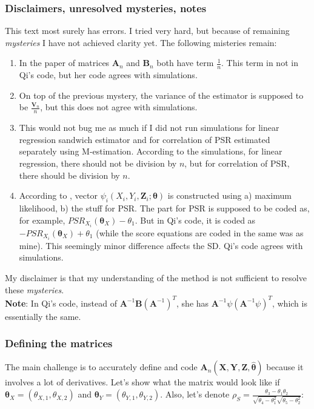 \documentclass[]{article}
\begin{document}
\subsubsection{Disclaimers, unresolved mysteries, notes}
This text most surely has errors. I tried very hard, but because of remaining \emph{mysteries} I have not achieved clarity yet. The following misteries remain:
\begin{enumerate}[1)]
  \item In the paper of \cite{stefanski2002calculus} matrices $\pmb{A}_n$ and $\pmb{B}_n$ both have term $\frac{1}{n}$. This term in not in Qi's code, but her code agrees with simulations.
  \item On top of the previous mystery, the variance of the estimator is supposed to be $\frac{\pmb{V}_n}{n}$, but this does not agree with simulations.
  \item This would not bug me as much if I did not run simulations for linear regression sandwich estimator and for correlation of PSR estimated separately using M-estimation. According to the simulations, for linear regression, there should not be division by $n$, but for correlation of PSR, there should be division by $n$.
  \item According to \cite{stefanski2002calculus}, vector $\psi_i(X_i, Y_i, \pmb{Z}_i; \pmb{\theta})$ is constructed using a) maximum likelihood, b) the stuff for PSR. The part for PSR is supposed to be coded as, for example, $PSR_{X_{i}}(\pmb{\theta}_X) -\theta_1$. But in Qi's code, it is coded as $-PSR_{X_{i}}(\pmb{\theta}_X) +\theta_1$ (while the score equations are coded in the same was as mine). This seemingly minor difference affects the SD. Qi's code agrees with simulations.
\end{enumerate}
My disclaimer is that my understanding of the method is not sufficient to resolve these \emph{mysteries}.\\

\textbf{Note}: In Qi's code, instead of $\pmb{A}^{-1}\pmb{B} (\pmb{A}^{-1})^T$, she has $\pmb{A}^{-1}\psi (\pmb{A}^{-1}\psi)^T$, which is essentially the same.


\subsubsection{Defining the matrices}
The main challenge is to accurately define and code $\pmb{A}_n(\pmb{X}, \pmb{Y}, \pmb{Z}, \hat{\pmb{\theta}})$ because it involves a lot of derivatives. Let's show what the matrix would look like if $\pmb{\theta}_X = (\theta_{X, 1}, \theta_{X, 2})$ and $\pmb{\theta}_Y= (\theta_{Y, 1}, \theta_{Y, 2})$. Also, let's denote $\rho_S = \frac{\theta_3 - \theta_1\theta_2}{\sqrt{\theta_4 - \theta_1^2}\sqrt{\theta_5 - \theta_2^2}}$:
\end{document}
